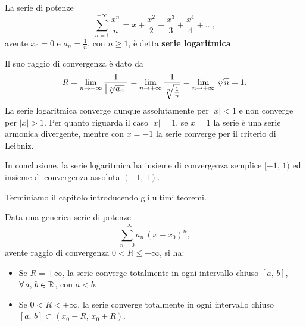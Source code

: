 \documentclass[../../analisi2]{subfiles}
\begin{document}
        \begin{definizione}
            La serie di potenze
            \[
                \sum_{n = 1}^{+\infty} \frac{x^n}{n} = x + \frac{x^2}{2} + \frac{x^3}{3} + \frac{x^4}{4} + \ldots,
            \]
            avente \(x_0 = 0\) e \(a_n = \frac{1}{n}\), con \(n \geqslant 1\), è detta \textbf{serie logaritmica}.

            Il suo raggio di convergenza è dato da
            \[
                R = \lim_{n \to +\infty} \frac{1}{\left|\sqrt[\leftroot{-1}n]{a_n}\right|} = \lim_{n \to +\infty} \frac{1}{\sqrt[\leftroot{-1}n]{\frac{1}{n}}} = \lim_{n \to +\infty} \sqrt[\leftroot{-1}n]{n} = 1.
            \]
            La serie logaritmica converge dunque assolutamente per \(|x| < 1\) e non converge per \(|x| > 1\). Per quanto riguarda
            il caso \(|x| = 1\), se \(x = 1\) la serie è una serie armonica divergente, mentre con \(x = -1\) la serie converge
            per il criterio di Leibniz.

            In conclusione, la serie logaritmica ha insieme di convergenza semplice \([-1, \, 1)\) ed insieme di convergenza
            assoluta \((-1, \, 1)\).
        \end{definizione}

        Terminiamo il capitolo introducendo gli ultimi teoremi.

        \begin{teorema}
            Data una generica serie di potenze
            \[
                \sum_{n = 0}^{+\infty} a_n \, (x - x_0)^n,
            \]
            avente raggio di convergenza \(0 < R \leqslant +\infty\), si ha:
            \begin{itemize}
                \item Se \(R = +\infty\), la serie converge totalmente in ogni intervallo chiuso \([a, \, b]\),
                    \(\forall \, a, \, b \in \mathbb{R}\), con \(a < b\).
                \item Se \(0 < R < +\infty\), la serie converge totalmente in ogni intervallo chiuso \([a, \, b] \subset (x_0 - R, \, x_0 + R)\).
            \end{itemize}
        \end{teorema}
\end{document}
